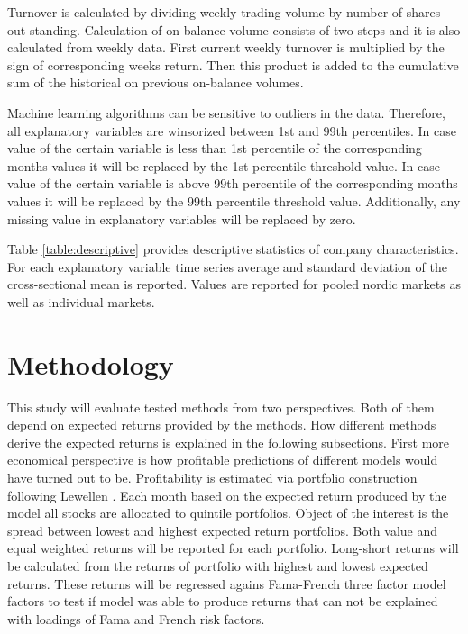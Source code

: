 \documentclass{article}
\begin{document}
Turnover is calculated by dividing weekly trading volume by number of shares out standing. Calculation of on balance volume consists of two steps and it is also calculated from weekly data. First current weekly turnover is multiplied by the sign of corresponding weeks return. Then this product is added to the cumulative sum of the historical on previous on-balance volumes.

Machine learning algorithms can be sensitive to outliers in the data. Therefore, all explanatory variables are winsorized between 1st and 99th percentiles. In case value of the certain variable is less than 1st percentile of the corresponding months values it will be replaced by the 1st percentile threshold value. In case value of the certain variable is above 99th percentile of the corresponding months values it will be replaced by the 99th percentile threshold value. %
Additionally, any missing value in explanatory variables will be replaced by zero.

Table \ref{table:descriptive} provides descriptive statistics of company characteristics. For each explanatory variable time series average and standard deviation of the cross-sectional mean is reported. Values are reported for pooled nordic markets as well as individual markets. %



\section{Methodology} \label{Methodology}

This study will evaluate tested methods from two perspectives. Both of them depend on expected returns provided by the methods. How different methods derive the expected returns is explained in the following subsections. First more economical perspective is how profitable predictions of different models would have turned out to be. Profitability is estimated via portfolio construction following Lewellen \citeyear{lewellen2015}. Each month based on the expected return produced by the model all stocks are allocated to quintile portfolios. Object of the interest is the spread between lowest and highest expected return portfolios. Both value and equal weighted returns will be reported for each portfolio. Long-short returns will be calculated from the returns of portfolio with highest and lowest expected returns. These returns will be regressed agains Fama-French \citeyear{FAMA19933} three factor model factors to test if model was able to produce returns that can not be explained with loadings of Fama and French risk factors.
\end{document}
